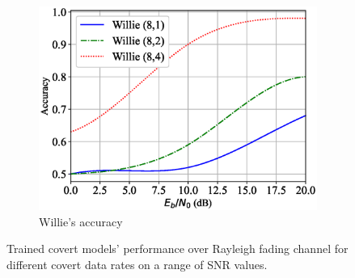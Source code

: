 \begin{figure}[tp!]
\begin{subfigure}{0.28\textwidth}
		\includegraphics[width=\linewidth]{figs/willie_accuracy_rayleigh}
		\caption{Willie's accuracy}
		\label{fig:rayleigh_resutls_willie}
	\end{subfigure}
	\caption{Trained covert models' performance over Rayleigh fading channel for different covert data rates on a range of SNR values.}
	\label{fig:rayleigh_resutls}
\end{figure}
